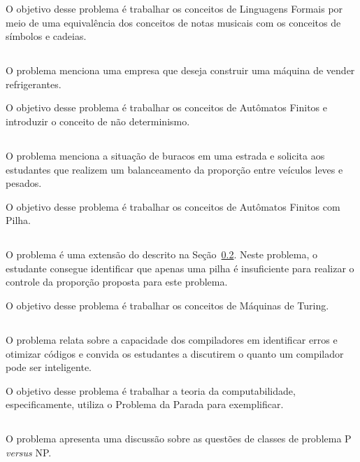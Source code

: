 O objetivo desse problema é trabalhar os conceitos de
Linguagens Formais por meio de uma equivalência dos conceitos
de notas musicais com os conceitos de símbolos e cadeias.

\subsection{\ProblemaB}
O problema menciona uma empresa que deseja construir uma máquina
de vender refrigerantes.

O objetivo desse problema é trabalhar os conceitos de Autômatos
Finitos e introduzir o conceito de não determinismo.

\subsection{\ProblemaC}
\label{problema3}
O problema menciona a situação de buracos em uma estrada e
solicita aos estudantes que realizem um balanceamento da proporção
entre veículos leves e pesados.

O objetivo desse problema é trabalhar os conceitos de Autômatos
Finitos com Pilha.

\subsection{\ProblemaD}
O problema é uma extensão do descrito na Seção~\ref{problema3}.
Neste problema, o estudante consegue identificar que apenas uma pilha
é insuficiente para realizar o controle da proporção proposta para este
problema.

O objetivo desse problema é trabalhar os conceitos de Máquinas de Turing.

\subsection{\ProblemaE}
O problema relata sobre a capacidade dos compiladores
em identificar erros e otimizar códigos e convida os
estudantes a discutirem o quanto um compilador
pode ser inteligente.

O objetivo desse problema é trabalhar a teoria da
computabilidade, especificamente, utiliza o Problema
da Parada para exemplificar.

\subsection{\ProblemaF}
O problema apresenta uma discussão sobre as questões
de classes de problema P \textit{versus} NP.

